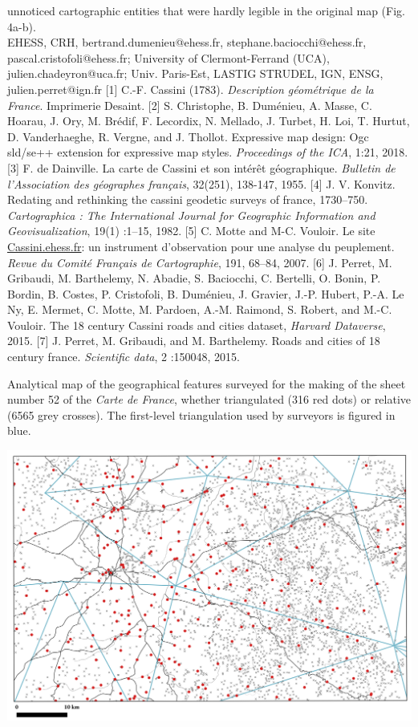 \documentclass[portrait,a0]{sciposter}
\begin{document}
\begin{minipage}[b]{\textwidth}
\begin{multicols}{3}
unnoticed cartographic entities that were hardly legible in the original map (Fig. 4a-b).\\
    \vfill
    \small
     EHESS, CRH, bertrand.dumenieu@ehess.fr, stephane.baciocchi@ehess.fr, pascal.cristofoli@ehess.fr;  University of Clermont-Ferrand (UCA), julien.chadeyron@uca.fr;  Univ. Paris-Est, LASTIG STRUDEL, IGN, ENSG, julien.perret@ign.fr
    \vfill
    [1] C.-F. Cassini (1783). \textit{Description géométrique de la France}. Imprimerie Desaint.
    [2] S. Christophe, B. Duménieu, A. Masse, C. Hoarau, J. Ory, M. Brédif, F. Lecordix, N. Mellado, J. Turbet, H. Loi, T. Hurtut, D. Vanderhaeghe, R. Vergne, and J. Thollot. Expressive map design: Ogc sld/se++ extension for expressive map styles. \textit{Proceedings of the ICA}, 1:21, 2018.
    [3] F. de Dainville. La carte de Cassini et son intérêt géographique. \textit{Bulletin de l'Association des géographes français}, 32(251), 138-147, 1955.
    [4] J. V. Konvitz. Redating and rethinking the cassini geodetic surveys of france, 1730–750. \textit{Cartographica : The International Journal for Geographic Information and Geovisualization}, 19(1) :1–15, 1982.
    [5] C. Motte and M-C. Vouloir. Le site \href{http://cassini.ehess.fr}{Cassini.ehess.fr}: un instrument d’observation pour une analyse du peuplement. \textit{Revue du Comité Français de Cartographie}, 191, 68–84, 2007.
    [6] J. Perret, M. Gribaudi, M. Barthelemy, N. Abadie, S. Baciocchi, C. Bertelli, O. Bonin, P. Bordin, B. Costes, P. Cristofoli, B. Duménieu, J. Gravier, J.-P. Hubert, P.-A. Le Ny, E. Mermet, C. Motte, M. Pardoen, A.-M. Raimond, S. Robert, and M.-C. Vouloir. The 18 century Cassini roads and cities dataset, \textit{Harvard Dataverse}, 2015.
    [7] J. Perret, M. Gribaudi, and M. Barthelemy. Roads and cities of 18 century france. \textit{Scientific data}, 2 :150048, 2015.
    \begin{center}
         \captionsetup{type=figure}
      \caption{Analytical map of the geographical features surveyed for the making of the sheet number 52 of the \textit{Carte de France}, whether triangulated (316 red dots) or relative (\num{6565} grey crosses). The first-level triangulation used by surveyors is figured in blue.}
      \label{map:triangulated-relative}
      \vspace{-0.5cm}\includegraphics[width=0.95\linewidth,trim= 0cm 0cm 0cm 0cm, clip]{gfx/Triangulated2.png}

\end{center}
\end{multicols}
\end{minipage}
\end{document}
